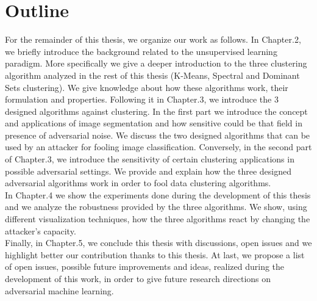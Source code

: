 \section{Outline}
For the remainder of this thesis, we organize our work as follows. In Chapter.2, we briefly introduce the background related to the unsupervised learning paradigm. More specifically we give a deeper introduction to the three clustering algorithm analyzed in the rest of this thesis (K-Means, Spectral and Dominant Sets clustering). We give knowledge about how these algorithms work, their formulation and properties. Following it in Chapter.3,  we introduce the 3 designed algorithms against clustering. In the first part we introduce the concept and applications of image segmentation and how sensitive could be that field in presence of adversarial noise. We discuss the two designed algorithms that can be used by an attacker for fooling image classification. Conversely, in the second part of Chapter.3, we introduce the sensitivity of certain clustering applications in possible adversarial settings. We provide and explain how the three designed adversarial algorithms work in order to fool data clustering algorithms.\\
In Chapter.4 we show the experiments done during the development of this thesis and we analyze the robustness provided by the three algorithms. We show, using different visualization techniques, how the three algorithms react by changing the attacker's capacity.\\
Finally, in Chapter.5, we conclude this thesis with discussions, open issues and we highlight better our contribution thanks to this thesis. At last, we propose a list of open issues, possible future improvements and ideas, realized during the development of this work, in order to give future research directions on adversarial machine learning.

